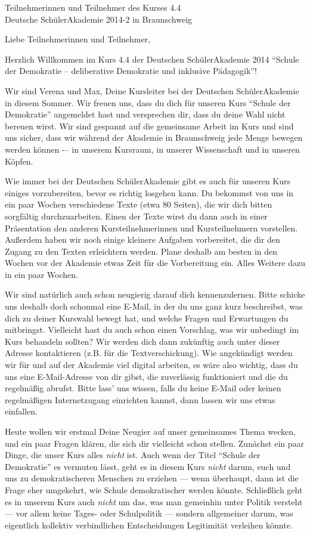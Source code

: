 \documentclass[a4paper]{letter}
\date{15.\ April 2014}
\begin{document}
\begin{letter}{
	Teilnehmerinnen und Teilnehmer des Kurses 4.4 \\
	Deutsche SchülerAkademie 2014-2 in Braunschweig}

\opening{Liebe Teilnehmerinnen und Teilnehmer,}

Herzlich Willkommen im Kurs 4.4 der Deutschen SchülerAkademie 2014 ``Schule der Demokratie -- deliberative Demokratie und inklusive Pädagogik''!

Wir sind Verena und Max, Deine Kursleiter bei der Deutschen SchülerAkademie in diesem Sommer.
Wir freuen uns, dass du dich für unseren Kurs ``Schule der Demokratie'' angemeldet hast und versprechen dir, dass du deine Wahl nicht bereuen wirst.
Wir sind gespannt auf die gemeinsame Arbeit im Kurs und sind uns sicher, dass wir während der Akademie in Braunschweig jede Menge bewegen werden können -– in unserem Kursraum, in unserer Wissenschaft und in unseren Köpfen.

Wie immer bei der Deutschen SchülerAkademie gibt es auch für unseren Kurs einiges vorzubereiten, bevor es richtig losgehen kann.
Du bekommst von uns in ein paar Wochen verschiedene Texte (etwa 80 Seiten), die wir dich bitten sorgfältig durchzuarbeiten.
Einen der Texte wirst du dann auch in einer Präsentation den anderen Kursteilnehmerinnen und Kursteilnehmern vorstellen.
Außerdem haben wir noch einige kleinere Aufgaben vorbereitet, die dir den Zugang zu den Texten erleichtern werden.
Plane deshalb am besten in den Wochen vor der Akademie etwas Zeit für die Vorbereitung ein.
Alles Weitere dazu in ein paar Wochen.

Wir sind natürlich auch schon neugierig darauf dich kennenzulernen.
Bitte schicke uns deshalb doch schonmal eine E-Mail, in der du uns ganz kurz beschreibst, was dich zu deiner Kurswahl bewegt hat, und welche Fragen und Erwartungen du mitbringst.
Vielleicht hast du auch schon einen Vorschlag, was wir unbedingt im Kurs behandeln sollten?
Wir werden dich dann zukünftig auch unter dieser Adresse kontaktieren (z.B. für die Textverschickung).
Wie angekündigt werden wir für und auf der Akademie viel digital arbeiten, es wäre also wichtig, dass du uns eine E-Mail-Adresse von dir gibst, die zuverlässig funktioniert und die du regelmäßig abrufst.
Bitte lass' uns wissen, falls du keine E-Mail oder keinen regelmäßigen Internetzugang einrichten kannst, dann lassen wir uns etwas einfallen.

Heute wollen wir erstmal Deine Neugier auf unser gemeinsames Thema wecken, und ein paar Fragen klären, die sich dir vielleicht schon stellen.
Zunächst ein paar Dinge, die unser Kurs alles \emph{nicht} ist.
Auch wenn der Titel ``Schule der Demokratie'' es vermuten lässt, geht es in diesem Kurs \emph{nicht} darum, euch und uns zu demokratischeren Menschen zu erziehen --- wenn überhaupt, dann ist die Frage eher umgekehrt, wie Schule demokratischer werden könnte.
Schließlich geht es in unserem Kurs auch \emph{nicht} um das, was man gemeinhin unter Politik versteht --- vor allem keine Tages- oder Schulpolitik --- sondern allgemeiner darum, was eigentlich kollektiv verbindlichen Entscheidungen Legitimität verleihen könnte.


\end{letter}
\end{document}
